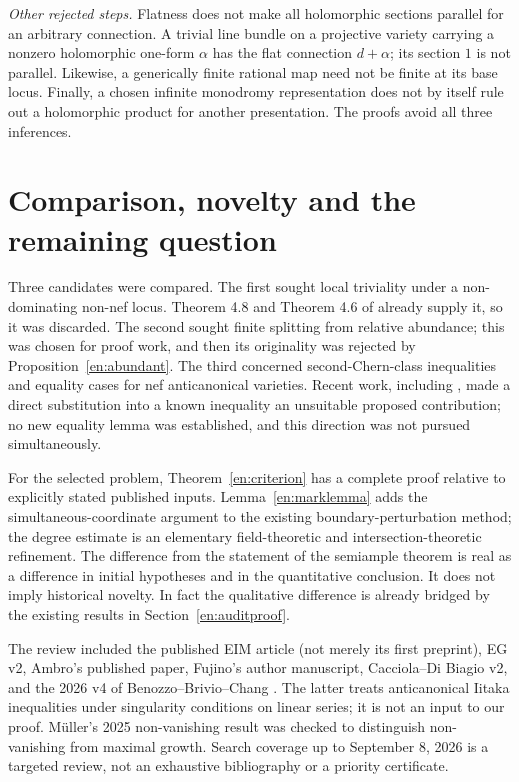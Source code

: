 \documentclass[12pt]{amsart}
\theoremstyle{definition}
\theoremstyle{remark}
\numberwithin{equation}{section}
\begin{document}
\textit{Other rejected steps.} Flatness does not make all holomorphic sections parallel for an arbitrary connection. A trivial line bundle on a projective variety carrying a nonzero holomorphic one-form $\alpha$ has the flat connection $d+\alpha$; its section $1$ is not parallel. Likewise, a generically finite rational map need not be finite at its base locus. Finally, a chosen infinite monodromy representation does not by itself rule out a holomorphic product for another presentation. The proofs avoid all three inferences.

\section{Comparison, novelty and the remaining question}\label{en:novelty}
Three candidates were compared. The first sought local triviality under a non-dominating non-nef locus. Theorem 4.8 and Theorem 4.6 of \cite{en:EIM} already supply it, so it was discarded. The second sought finite splitting from relative abundance; this was chosen for proof work, and then its originality was rejected by Proposition~\ref{en:abundant}. The third concerned second-Chern-class inequalities and equality cases for nef anticanonical varieties. Recent work, including \cite{en:IJZ}, made a direct substitution into a known inequality an unsuitable proposed contribution; no new equality lemma was established, and this direction was not pursued simultaneously.

For the selected problem, Theorem~\ref{en:criterion} has a complete proof relative to explicitly stated published inputs. Lemma~\ref{en:marklemma} adds the simultaneous-coordinate argument to the existing boundary-perturbation method; the degree estimate is an elementary field-theoretic and intersection-theoretic refinement. The difference from the statement of the semiample theorem is real as a difference in initial hypotheses and in the quantitative conclusion. It does not imply historical novelty. In fact the qualitative difference is already bridged by the existing results in Section~\ref{en:auditproof}.

The review included the published EIM article (not merely its first preprint), EG v2, Ambro's published paper, Fujino's author manuscript, Cacciola--Di Biagio v2, and the 2026 v4 of Benozzo--Brivio--Chang \cite{en:BBC}. The latter treats anticanonical Iitaka inequalities under singularity conditions on linear series; it is not an input to our proof. M\"uller's 2025 non-vanishing result \cite{en:Mu} was checked to distinguish non-vanishing from maximal growth. Search coverage up to September 8, 2026 is a targeted review, not an exhaustive bibliography or a priority certificate.
\end{document}
